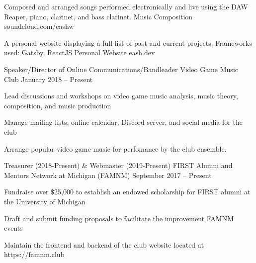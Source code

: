 \documentclass[]{awesome-cv}
\begin{document}

	
	\vspace{-6mm}
	\cventry
	{Composed and arranged songs performed electronically and live using the DAW Reaper, piano, clarinet, and bass clarinet.}
	{Music Composition}
	{soundcloud.com/eashw}
	{}
	{}
	
	\vspace{-6mm}
	\cventry
	{A personal website displaying a full list of past and current projects. Frameworks used: Gatsby, ReactJS}
	{Personal Website}
	{eash.dev}
	{}
	{}
	
	\vspace{-5mm}

\vspace{-2mm}
\vspace{-2mm}
	\cventry
	{Speaker/Director of Online Communications/Bandleader}
	{Video Game Music Club}
	{}
	{January 2018 – Present}
	{\begin{cvitems}
		\item {Lead discussions and workshops on video game music analysis, music theory, composition, and music production}
		\item {Manage mailing lists, online calendar, Discord server, and social media for the club}
		\item {Arrange popular video game music for perfomance by the club ensemble.}
		\end{cvitems}}

	\vspace{-4mm}
	\cventry
	{Treasurer (2018-Present) \& Webmaster (2019-Present)}
	{FIRST Alumni and Mentors Network at Michigan (FAMNM)}
	{}
	{September 2017 – Present}
	{\begin{cvitems}
		\item {Fundraise over \$25,000 to establish an endowed scholarship for FIRST alumni at the University of Michigan}
		\item {Draft and submit funding proposals to facilitate the improvement FAMNM events}
		\item {Maintain the frontend and backend of the club website located at https://famnm.club}
		\end{cvitems}}
	
\end{document}
